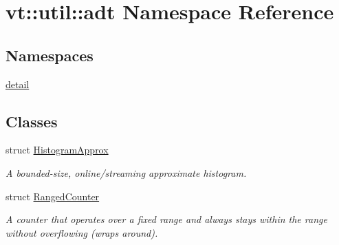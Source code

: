 \hypertarget{namespacevt_1_1util_1_1adt}{}\section{vt\+:\+:util\+:\+:adt Namespace Reference}
\label{namespacevt_1_1util_1_1adt}
\subsection*{Namespaces}
\begin{DoxyCompactItemize}
\item 
 \hyperlink{namespacevt_1_1util_1_1adt_1_1detail}{detail}
\end{DoxyCompactItemize}
\subsection*{Classes}
\begin{DoxyCompactItemize}
\item 
struct \hyperlink{structvt_1_1util_1_1adt_1_1_histogram_approx}{Histogram\+Approx}
\begin{DoxyCompactList}\small\item\em A bounded-\/size, online/streaming approximate histogram. \end{DoxyCompactList}\item 
struct \hyperlink{structvt_1_1util_1_1adt_1_1_ranged_counter}{Ranged\+Counter}
\begin{DoxyCompactList}\small\item\em A counter that operates over a fixed range and always stays within the range without overflowing (wraps around). \end{DoxyCompactList}\end{DoxyCompactItemize}

